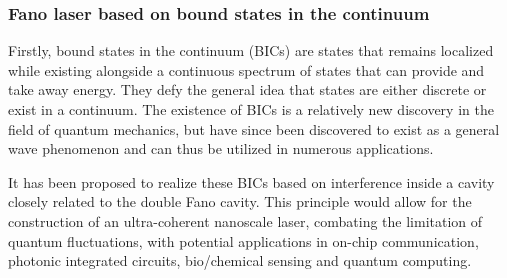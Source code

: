 \subsubsection{Fano laser based on bound states in the continuum}

Firstly, bound states in the continuum (BICs) are states that remains localized while existing alongside a continuous spectrum of states that can provide and take away energy. They defy the general idea that states are either discrete or exist in a continuum. The existence of BICs is a relatively new discovery in the field of quantum mechanics, but have since been discovered to exist as a general wave phenomenon and can thus be utilized in numerous applications\cite{Hsu}. 

It has been proposed to realize these BICs based on interference inside a cavity closely related to the double Fano cavity. This principle would allow for the construction of an ultra-coherent nanoscale laser, combating the limitation of quantum fluctuations, with potential applications in on-chip communication, photonic integrated circuits, bio/chemical sensing and quantum computing\cite{Yu}. 

